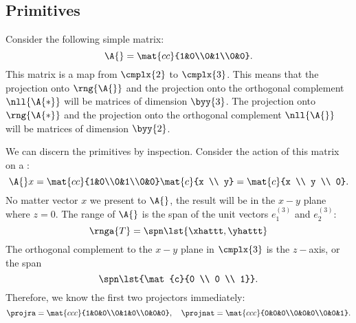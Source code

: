 \subsection{Primitives}
Consider the following simple matrix:
\begin{equation}
  \A{}= \mat{cc}{1&0\\0&1\\0&0}.
\end{equation}
This matrix is a map from $\cmplx{2}$ to $\cmplx{3}$. This means that the projection onto $\rng{\A{}}$ and the projection onto the orthogonal complement $\nll{\A{*}}$ will be matrices of dimension $\byy{3}$. The projection onto $\rng{\A{*}}$ and the projection onto the orthogonal complement $\nll{\A{}}$ will be matrices of dimension $\byy{2}$.

We can discern the primitives by inspection. Consider the action of this matrix on a \vvv:
\begin{equation}
  \A{}x = \mat{cc}{1&0\\0&1\\0&0}
          \mat{c}{x \\ y}
        = \mat{c}{x \\ y \\ 0}.
\end{equation}
No matter vector $x$ we present to $\A{}$, the result will be in the $x-y$ plane where $z=0$.
The range of $\A{}$ is the span of the unit vectors $e_{1}^{(3)}$ and $e_{2}^{(3)}$:
\begin{equation}
  \rnga{T} = \spn \lst{\xhattt,\yhattt}
\end{equation}
The orthogonal complement to the $x-y$ plane in $\cmplx{3}$ is the $z-$axis, or the span
\begin{equation*}
  \spn \lst{\mat{c}{0 \\ 0 \\ 1}}.
\end{equation*}
Therefore, we know the first two projectors immediately:
\begin{equation}
  \projra = \mat{ccc}{1&0&0\\0&1&0\\0&0&0}, \quad \projnat = \mat{ccc}{0&0&0\\0&0&0\\0&0&1}.
\end{equation}

